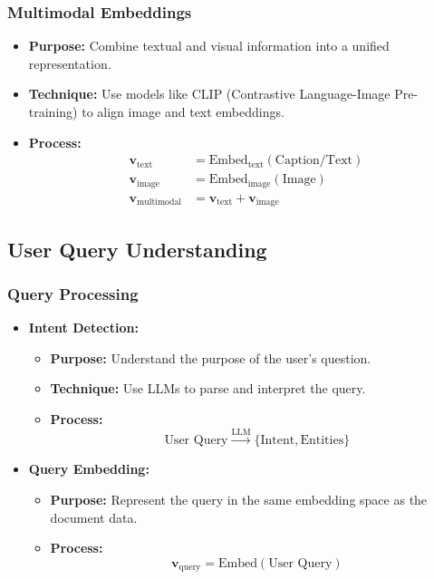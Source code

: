 \documentclass[12pt]{article}
\begin{document}
\subsubsection{Multimodal Embeddings}

\begin{itemize}
    \item \textbf{Purpose:} Combine textual and visual information into a unified representation.
    \item \textbf{Technique:} Use models like CLIP (Contrastive Language-Image Pre-training) to align image and text embeddings.
    \item \textbf{Process:}
    \[
    \begin{align*}
    \mathbf{v}_{\text{text}} &= \text{Embed}_{\text{text}}(\text{Caption/Text}) \\
    \mathbf{v}_{\text{image}} &= \text{Embed}_{\text{image}}(\text{Image}) \\
    \mathbf{v}_{\text{multimodal}} &= \mathbf{v}_{\text{text}} + \mathbf{v}_{\text{image}}
    \end{align*}
    \]
\end{itemize}

\subsection{User Query Understanding}

\subsubsection{Query Processing}

\begin{itemize}
    \item \textbf{Intent Detection:}
    \begin{itemize}
        \item \textbf{Purpose:} Understand the purpose of the user's question.
        \item \textbf{Technique:} Use LLMs to parse and interpret the query.
        \item \textbf{Process:}
        \[
        \text{User Query} \xrightarrow{\text{LLM}} \{\text{Intent}, \text{Entities}\}
        \]
    \end{itemize}
    \item \textbf{Query Embedding:}
    \begin{itemize}
        \item \textbf{Purpose:} Represent the query in the same embedding space as the document data.
        \item \textbf{Process:}
        \[
        \mathbf{v}_{\text{query}} = \text{Embed}(\text{User Query})
        \]
    \end{itemize}
\end{itemize}
\end{document}
